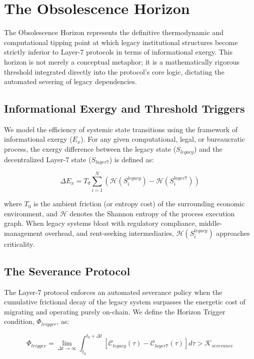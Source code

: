 \chapter{The Obsolescence Horizon}
\label{ch:obsolescence_horizon}

The Obsolescence Horizon represents the definitive thermodynamic and computational tipping point at which legacy institutional structures become strictly inferior to Layer-7 protocols in terms of informational exergy. This horizon is not merely a conceptual metaphor; it is a mathematically rigorous threshold integrated directly into the protocol's core logic, dictating the automated severing of legacy dependencies.

\section{Informational Exergy and Threshold Triggers}

We model the efficiency of systemic state transitions using the framework of informational exergy ($E_x$). For any given computational, legal, or bureaucratic process, the exergy difference between the legacy state ($S_{legacy}$) and the decentralized Layer-7 state ($S_{layer7}$) is defined as:

\begin{equation}
    \Delta E_x = T_0 \sum_{i=1}^{N} \left( \mathcal{H}(S_{i}^{legacy}) - \mathcal{H}(S_{i}^{layer7}) \right)
\end{equation}

where $T_0$ is the ambient friction (or entropy cost) of the surrounding economic environment, and $\mathcal{H}$ denotes the Shannon entropy of the process execution graph. When legacy systems bloat with regulatory compliance, middle-management overhead, and rent-seeking intermediaries, $\mathcal{H}(S_{i}^{legacy})$ approaches criticality.

\section{The Severance Protocol}

The Layer-7 protocol enforces an automated severance policy when the cumulative frictional decay of the legacy system surpasses the energetic cost of migrating and operating purely on-chain. We define the Horizon Trigger condition, $\Phi_{trigger}$, as:

\begin{equation}
    \Phi_{trigger} = \lim_{\Delta t \to \infty} \int_{t_0}^{t_0 + \Delta t} \left[ \mathcal{C}_{legacy}(\tau) - \mathcal{C}_{layer7}(\tau) \right] d\tau > \mathcal{K}_{severance}
\end{equation}

